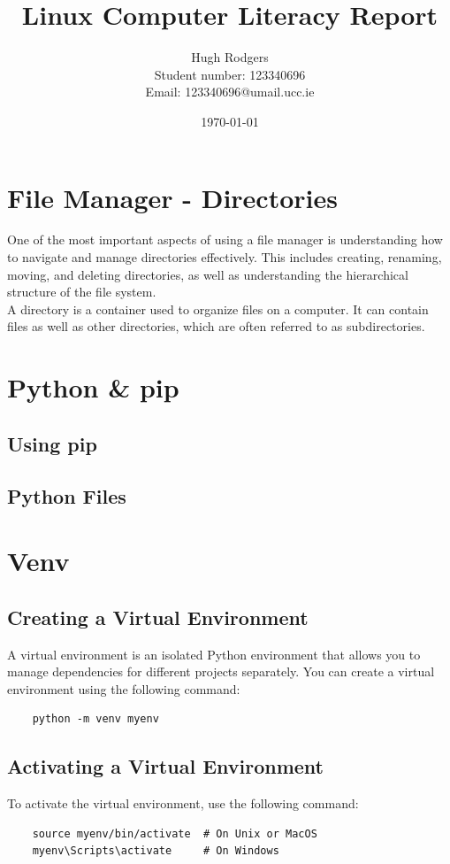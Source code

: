 \documentclass[a4paper,11pt]{article}
\title{Linux Computer Literacy Report}
\author{Hugh Rodgers \\ Student number: 123340696 \\ Email: 123340696@umail.ucc.ie}
\date{\today}
\begin{document}
\maketitle

\tableofcontents
\newpage  


\section{File Manager - Directories}
One of the most important aspects of using a file manager is understanding how to navigate and manage directories effectively.
This includes creating, renaming, moving, and deleting directories, as well as understanding the hierarchical structure of the file system.\\

A directory is a container used to organize files on a computer. It can contain files as well as other directories, which are often referred to as subdirectories.


\section{Python \& pip}

    \subsection{Using pip}

    \subsection{Python Files}




\section{Venv}

    \subsection{Creating a Virtual Environment}
    A virtual environment is an isolated Python environment that allows you to manage dependencies for different projects separately. You can create a virtual environment using the following command:
    \begin{verbatim}
    python -m venv myenv
    \end{verbatim}

    \subsection{Activating a Virtual Environment}
    To activate the virtual environment, use the following command:
    \begin{verbatim}
    source myenv/bin/activate  # On Unix or MacOS
    myenv\Scripts\activate     # On Windows
    \end{verbatim}
\end{document}
